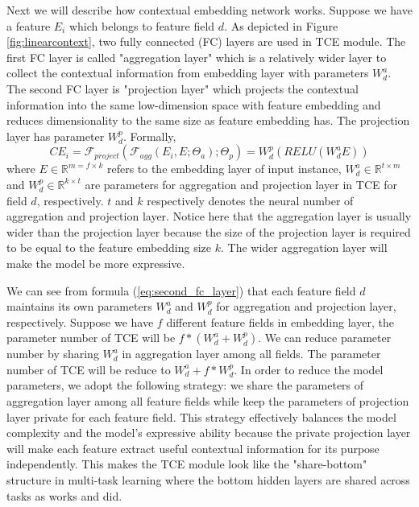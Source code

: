 \documentclass[sigconf]{acmart}
\begin{document}
Next we will describe how contextual embedding network works. Suppose we have a feature $E_i$ which belongs to feature field $d$. As depicted in Figure \ref{fig:linearcontext}, two fully connected (FC) layers are used in TCE module. The first FC layer is called "aggregation layer" which is a relatively wider layer to collect the contextual information from embedding layer with parameters $W^a_d$. The second FC layer is "projection layer" which projects the contextual information into the same low-dimension space with feature embedding and reduces dimensionality to the same size as feature embedding has. The projection layer has parameter $W_d^p$. Formally,
\begin{equation}
  CE_i = \mathcal{F}_{project}(\mathcal{F}_{agg}(E_i, E; \Theta_a); \Theta_p) = W_d^p(RELU(W_d^aE))
  \label{eq:second_fc_layer}
\end{equation}
where $E \in \mathbb{R}^{m=f\times k}$ refers to the embedding layer of input instance, $W_d^a \in \mathbb{R}^{t\times m}$ and $W_d^p \in \mathbb{R}^{k\times t}$ are parameters for aggregation and projection layer in TCE for field $d$, respectively. $t$ and $k$ respectively denotes the neural number of aggregation and projection layer. Notice here that the aggregation layer is usually wider than the projection layer because the size of the projection layer is required to be equal to the feature embedding size $k$. The wider aggregation layer will make the model be more  expressive.


We can see from formula (\ref{eq:second_fc_layer}) that each feature field $d$ maintains its own parameters $W_d^a$ and $W_d^p$ for aggregation and projection layer, respectively. Suppose we have $f$ different feature fields in embedding layer, the parameter number of TCE will be $f\ast(W_d^a + W_d^p)$. We can reduce parameter number by sharing $W_d^a$ in aggregation layer among all fields. The parameter number of TCE will be reduce to $W_d^a + f\ast W_d^p$. In order to reduce the model parameters, we adopt the following strategy: we share the parameters of aggregation layer among all feature fields while keep the parameters of projection layer private for each feature field. This strategy effectively balances the model complexity and  the model's expressive ability because the private projection layer will make each feature extract useful contextual information for its purpose independently. This makes the TCE module look like the "share-bottom" structure in multi-task learning where the bottom hidden layers are shared across tasks as works \cite{caruana1997multitask} and \cite{caruana1993multitask} did.
\end{document}
